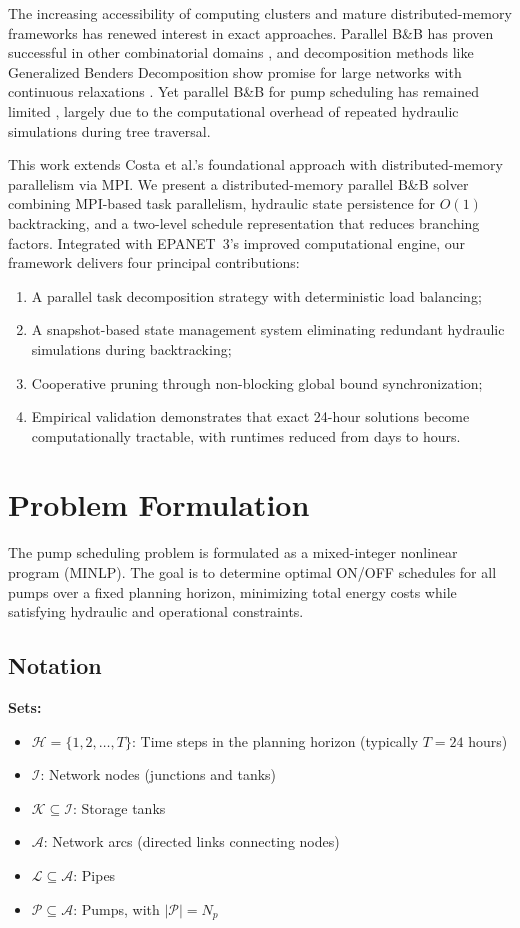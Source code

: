 \documentclass[a4paper,fleqn]{cas-dc}
\begin{document}
The increasing accessibility of computing clusters and mature distributed-memory frameworks has renewed interest in exact approaches. Parallel B\&B has proven successful in other combinatorial domains \cite{Gendron1994,Li1986,Hrga2021}, and decomposition methods like Generalized Benders Decomposition show promise for large networks with continuous relaxations \cite{Verleye2016}. Yet parallel B\&B for pump scheduling has remained limited \cite{Reis2023}, largely due to the computational overhead of repeated hydraulic simulations during tree traversal.

This work extends Costa et al.'s foundational approach \cite{Costa2016} with distributed-memory parallelism via MPI. We present a distributed-memory parallel B\&B solver combining MPI-based task parallelism, hydraulic state persistence for $O(1)$ backtracking, and a two-level schedule representation that reduces branching factors. Integrated with EPANET~3's improved computational engine, our framework delivers four principal contributions:
\begin{enumerate}
	\item A parallel task decomposition strategy with deterministic load balancing;
	\item A snapshot-based state management system eliminating redundant hydraulic simulations during backtracking;
	\item Cooperative pruning through non-blocking global bound synchronization;
	\item Empirical validation demonstrates that exact 24-hour solutions become computationally tractable, with runtimes reduced from days to hours.
\end{enumerate}

\section{Problem Formulation}

The pump scheduling problem is formulated as a mixed-integer nonlinear program (MINLP). The goal is to determine optimal ON/OFF schedules for all pumps over a fixed planning horizon, minimizing total energy costs while satisfying hydraulic and operational constraints.

\subsection{Notation}

\textbf{Sets:}
\begin{itemize}
	\item $\mathcal{H} = \{1, 2, \ldots, T\}$: Time steps in the planning horizon (typically $T = 24$ hours)
	\item $\mathcal{I}$: Network nodes (junctions and tanks)
	\item $\mathcal{K} \subseteq \mathcal{I}$: Storage tanks
	\item $\mathcal{A}$: Network arcs (directed links connecting nodes)
	\item $\mathcal{L} \subseteq \mathcal{A}$: Pipes
	\item $\mathcal{P} \subseteq \mathcal{A}$: Pumps, with $|\mathcal{P}| = N_p$
\end{itemize}
\end{document}
